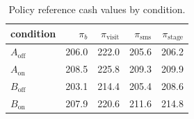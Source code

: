 \begin{table}[!htbp]
\centering
\caption{Policy reference cash values by condition.}
\label{tab:campaignvalues_cash}
\footnotesize
\begin{tabular}{lrrrr}
\toprule
condition & $\pi_b$ & $\pi_{\mathrm{visit}}$ & $\pi_{\mathrm{sms}}$ & $\pi_{\mathrm{stage}}$ \\
\midrule
$A_{\mathrm{off}}$ & 206.0 & 222.0 & 205.6 & 206.2 \\
$A_{\mathrm{on}}$ & 208.5 & 225.8 & 209.3 & 209.9 \\
$B_{\mathrm{off}}$ & 203.1 & 214.4 & 205.4 & 208.6 \\
$B_{\mathrm{on}}$ & 207.9 & 220.6 & 211.6 & 214.8 \\
\bottomrule
\end{tabular}
\end{table}
